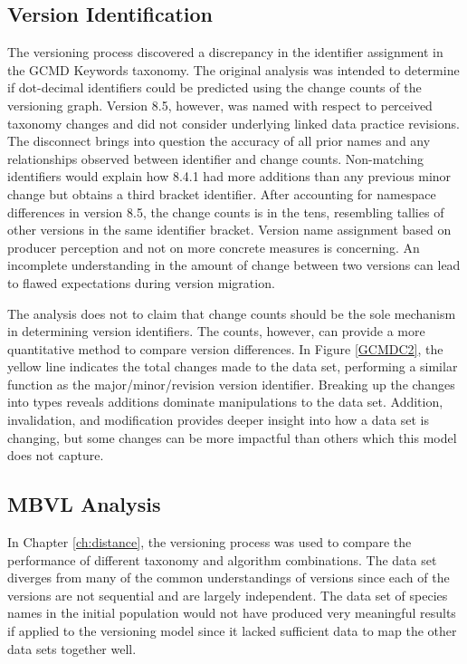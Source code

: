 \subsection{Version Identification}

The versioning process discovered a discrepancy in the identifier assignment in the GCMD Keywords taxonomy.
The original analysis was intended to determine if dot-decimal identifiers could be predicted using the change counts of the versioning graph.
Version 8.5, however, was named with respect to perceived taxonomy changes and did not consider underlying linked data practice revisions.
The disconnect brings into question the accuracy of all prior names and any relationships observed between identifier and change counts.
Non-matching identifiers would explain how 8.4.1 had more additions than any previous minor change but obtains a third bracket identifier.
After accounting for namespace differences in version 8.5, the change counts is in the tens, resembling tallies of other versions in the same identifier bracket.
Version name assignment based on producer perception and not on more concrete measures is concerning.
An incomplete understanding in the amount of change between two versions can lead to flawed expectations during version migration.

The analysis does not to claim that change counts should be the sole mechanism in determining version identifiers.
The counts, however, can provide a more quantitative method to compare version differences.
In Figure \ref{GCMDC2}, the yellow line indicates the total changes made to the data set, performing a similar function as the major/minor/revision version identifier.
Breaking up the changes into types reveals additions dominate manipulations to the data set.
Addition, invalidation, and modification provides deeper insight into how a data set is changing, but some changes can be more impactful than others which this model does not capture.

\subsection{MBVL Analysis}

In Chapter \ref{ch:distance}, the versioning process was used to compare the performance of different taxonomy and algorithm combinations.
The data set diverges from many of the common understandings of versions since each of the versions are not sequential and are largely independent.
The data set of species names in the initial population would not have produced very meaningful results if applied to the versioning model since it lacked sufficient data to map the other data sets together well.


